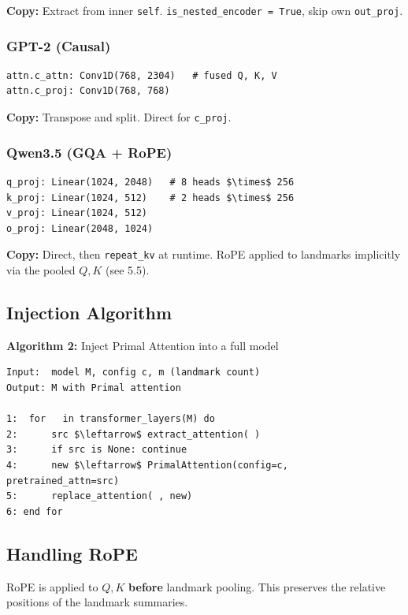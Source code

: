 \textbf{Copy:} Extract from inner \texttt{self}. \texttt{is\_nested\_encoder = True}, skip own 
\texttt{out\_proj}.

\subsubsection{GPT-2 (Causal)}

\begin{lstlisting}
attn.c_attn: Conv1D(768, 2304)   # fused Q, K, V
attn.c_proj: Conv1D(768, 768)
\end{lstlisting}

\textbf{Copy:} Transpose and split. Direct for \texttt{c\_proj}.

\subsubsection{Qwen3.5 (GQA + RoPE)}

\begin{lstlisting}
q_proj: Linear(1024, 2048)   # 8 heads $\times$ 256
k_proj: Linear(1024, 512)    # 2 heads $\times$ 256
v_proj: Linear(1024, 512)
o_proj: Linear(2048, 1024)
\end{lstlisting}

\textbf{Copy:} Direct, then \texttt{repeat\_kv} at runtime. RoPE applied to landmarks 
implicitly via the pooled $Q, K$ (see  5.5).

\subsection{Injection Algorithm}

\textbf{Algorithm 2:} Inject Primal Attention into a full model
\begin{lstlisting}
Input:  model M, config c, m (landmark count)
Output: M with Primal attention

1:  for   in transformer_layers(M) do
2:      src $\leftarrow$ extract_attention( )
3:      if src is None: continue
4:      new $\leftarrow$ PrimalAttention(config=c, pretrained_attn=src)
5:      replace_attention( , new)
6: end for
\end{lstlisting}

\subsection{Handling RoPE}

RoPE is applied to $Q, K$ \textbf{before} landmark pooling. This preserves the 
relative positions of the landmark summaries.

